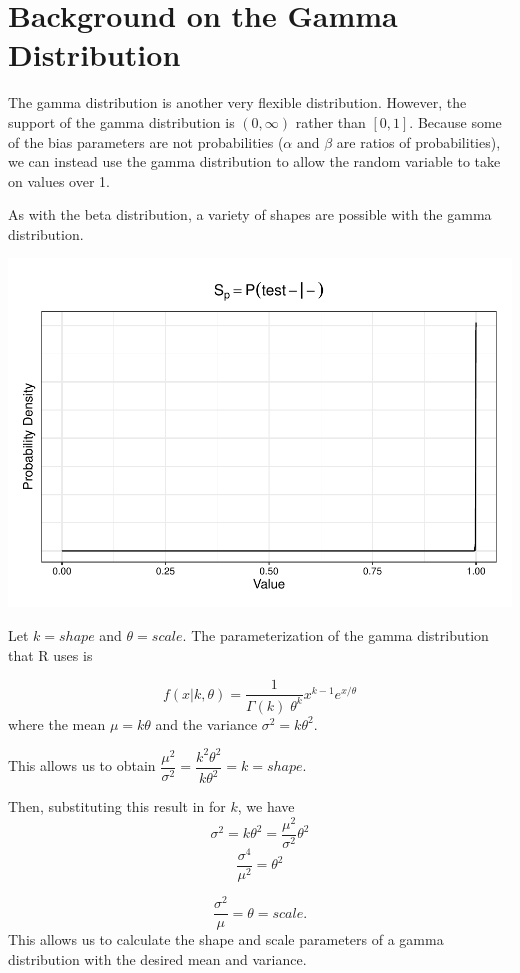 \documentclass[12pt,twoside]{smiththesis}
\begin{document}
\hypertarget{background-on-the-gamma-distribution}{%
\section{Background on the Gamma Distribution}\label{background-on-the-gamma-distribution}}

The gamma distribution is another very flexible distribution. However, the support of the gamma distribution is \((0,\infty)\) rather than \([0,1]\). Because some of the bias parameters are not probabilities (\(\alpha\) and \(\beta\) are ratios of probabilities), we can instead use the gamma distribution to allow the random variable to take on values over 1.

As with the beta distribution, a variety of shapes are possible with the gamma distribution.
\begin{center}\includegraphics[width=0.9\linewidth]{thesis_files/figure-latex/unnamed-chunk-49-1} \end{center}

Let \(k=shape\) and \(\theta=scale\). The parameterization of the gamma distribution that R uses is

\[f(x|k,\theta) = \frac{1}{\Gamma(k) \;\theta^k}x^{k-1} e^{x/\theta}\]
where the mean \(\mu =k\theta\) and the variance \(\sigma^2 = k\theta^2\).

This allows us to obtain \(\dfrac{\mu^2}{\sigma^2} = \dfrac{k^2 \theta^2}{k\theta^2} = k =shape\).

Then, substituting this result in for \(k\), we have \[\sigma^2 = k \theta^2 = \dfrac{\mu^2}{\sigma^2} \theta^2\]
\[\frac{\sigma^4}{\mu^2}=\theta^2\]

\[\frac{\sigma^2}{\mu}=\theta = scale.\]
This allows us to calculate the shape and scale parameters of a gamma distribution with the desired mean and variance.
\end{document}
